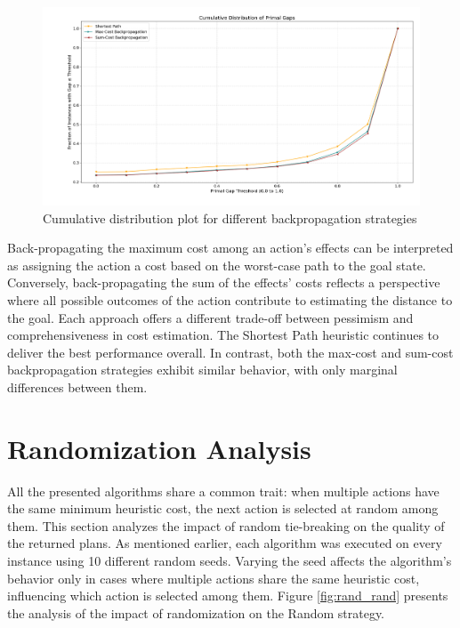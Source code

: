 \begin{figure}[ht]
	\centering
	\includegraphics[width=\textwidth]{images/algs456.png}
	\caption{Cumulative distribution plot for different backpropagation strategies}
	\label{fig:backprop}
\end{figure}

Back-propagating the maximum cost among an action’s effects can be interpreted as assigning the action a cost based on
the worst-case path to the goal state. Conversely, back-propagating the sum of the effects' costs reflects a perspective
where all possible outcomes of the action contribute to estimating the distance to the goal. Each approach offers a different
trade-off between pessimism and comprehensiveness in cost estimation.
The Shortest Path heuristic continues to deliver the best performance overall. In contrast, both the max-cost and sum-cost
backpropagation strategies exhibit similar behavior, with only marginal differences between them.

\section{Randomization Analysis}
All the presented algorithms share a common trait: when multiple actions have the same minimum heuristic cost,
the next action is selected at random among them.
This section analyzes the impact of random tie-breaking on the quality of the returned plans. As mentioned earlier,
each algorithm was executed on every instance using 10 different random seeds. Varying the seed affects the algorithm’s
behavior only in cases where multiple actions share the same heuristic cost, influencing which action is selected among them.
Figure \ref{fig:rand_rand} presents the analysis of the impact of randomization on the Random strategy.

